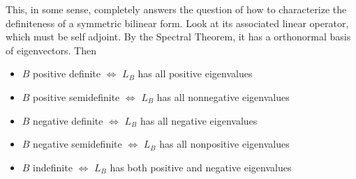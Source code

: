 This, in some sense, completely answers the question of how to characterize the definiteness of a symmetric bilinear form.  Look at its associated linear operator, 
which must be self adjoint.  By the Spectral Theorem, it has a orthonormal basis of eigenvectors.  Then 
\begin{itemize}
	\item $B$ positive definite $\Longleftrightarrow$ $L_B$ has all positive eigenvalues
	\item $B$ positive semidefinite $\Longleftrightarrow$ $L_B$ has all nonnegative eigenvalues
	\item $B$ negative definite $\Longleftrightarrow$ $L_B$ has all negative eigenvalues
	\item $B$ negative semidefinite $\Longleftrightarrow$ $L_B$ has all nonpositive eigenvalues
	\item $B$ indefinite $\Longleftrightarrow$ $L_B$ has both positive and negative eigenvalues
\end{itemize}
	
